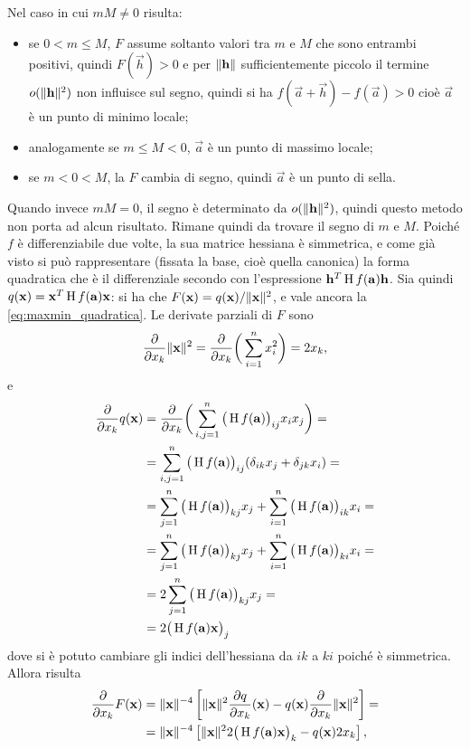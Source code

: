 Nel caso in cui $mM\neq 0$ risulta:
\begin{itemize}
\item se $0<m\leq M$, $F$ assume soltanto valori tra $m$ e $M$ che sono entrambi positivi, quindi $F(\vec h)>0$ e per $\lVert\mathbf{h}\rVert$ sufficientemente piccolo il termine $o(\lVert\mathbf{h}\rVert^2)$ non influisce sul segno, quindi si ha $f(\vec a+\vec h)-f(\vec a)>0$ cioè $\vec a$ è un punto di minimo locale;
\item analogamente se $m\leq M<0$, $\vec a$ è un punto di massimo locale;
\item se $m<0<M$, la $F$ cambia di segno, quindi $\vec a$ è un punto di sella.
\end{itemize}
Quando invece $mM=0$, il segno è determinato da $o(\lVert\mathbf{h}\rVert^2)$, quindi questo metodo non porta ad alcun risultato.
Rimane quindi da trovare il segno di $m$ e $M$. Poiché $f$ è differenziabile due volte, la sua matrice hessiana è simmetrica, e come già visto si può rappresentare (fissata la base, cioè quella canonica) la forma quadratica che è il differenziale secondo con l'espressione $\mathbf{h}^T\operatorname{H} f(\mathbf{a})\mathbf{h}$. Sia quindi $q(\mathbf{x})=\mathbf{x}^T\operatorname{H} f(\mathbf{a})\mathbf{x}$: si ha che $F(\mathbf{x})=q(\mathbf{x})/\lVert\mathbf{x}\rVert^2$, e vale ancora la \eqref{eq:maxmin_quadratica}.
Le derivate parziali di $F$ sono
\[
\frac{\partial {}}{\partial {x_k}}\lVert\mathbf{x}\rVert^2=\frac{\partial {}}{\partial {x_k}}\bigg(\sum_{i=1}^nx_i^2\bigg)=2x_k,
\]
e
\[\begin{split}
\frac{\partial {}}{\partial {x_k}}q(\mathbf{x})	&=\frac{\partial {}}{\partial {x_k}}\bigg(\sum_{i,j=1}^n\big(\operatorname{H} f(\mathbf{a})\big)_{ij}x_ix_j\bigg)=\\
					&=\sum_{i,j=1}^n\big(\operatorname{H} f(\mathbf{a})\big)_{ij}(\delta_{ik}x_j+\delta_{jk}x_i)=\\
					&=\sum_{j=1}^n\big(\operatorname{H} f(\mathbf{a})\big)_{kj}x_j+\sum_{i=1}^n\big(\operatorname{H} f(\mathbf{a})\big)_{ik}x_i=\\
					&=\sum_{j=1}^n\big(\operatorname{H} f(\mathbf{a})\big)_{kj}x_j+\sum_{i=1}^n\big(\operatorname{H} f(\mathbf{a})\big)_{ki}x_i=\\
					&=2\sum_{j=1}^n\big(\operatorname{H} f(\mathbf{a})\big)_{kj}x_j=\\
					&=2\big(\operatorname{H} f(\mathbf{a})\mathbf{x}\big)_j
\end{split}\]
dove si è potuto cambiare gli indici dell'hessiana da $ik$ a $ki$ poiché è simmetrica.
Allora risulta
\[\begin{split}
\frac{\partial {}}{\partial {x_k}}F(\mathbf{x})	&=\lVert\mathbf{x}\rVert^{-4}\left[\lVert\mathbf{x}\rVert^2\frac{\partial {q}}{\partial {x_k}}(\mathbf{x})-q(\mathbf{x})\frac{\partial {}}{\partial {x_k}}\lVert\mathbf{x}\rVert^2\right]=\\
					&=\lVert\mathbf{x}\rVert^{-4}\left[\lVert\mathbf{x}\rVert^22\big(\operatorname{H} f(\mathbf{a})\mathbf{x}\big)_k-q(\mathbf{x})2x_k\right],
\end{split}\]
